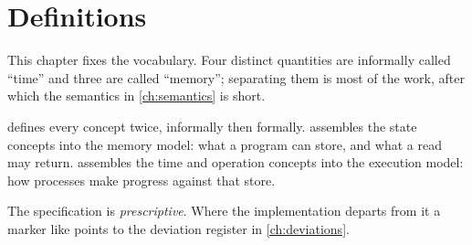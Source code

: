 \chapter{Definitions}
\label{ch:definitions}

This chapter fixes the vocabulary. Four distinct quantities are informally
called ``time'' and three are called ``memory''; separating them is most of
the work, after which the semantics in \cref{ch:semantics} is short.

 defines every concept twice, informally then formally.
 assembles the state concepts into the memory model:
what a program can store, and what a read may return.
 assembles the time and \gls{operation} concepts
into the execution model: how processes make progress against that store.

The specification is \emph{prescriptive}. Where the implementation departs
from it a marker like  points to the deviation
register in \cref{ch:deviations}.




